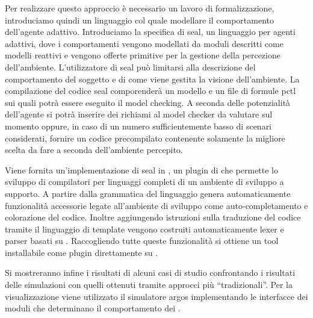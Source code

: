 Per realizzare questo approccio è necessario un lavoro di formalizzazione, introduciamo quindi un linguaggio col quale modellare il comportamento dell'agente adattivo. Introduciamo la specifica di \ac{seal}, un linguaggio per agenti adattivi, dove i comportamenti vengono modellati da moduli descritti come modelli reattivi e vengono offerte primitive per la gestione della percezione dell'ambiente. L'utilizzatore di \ac{seal} può limitarsi alla descrizione del comportamento del soggetto e di come viene gestita la visione dell'ambiente. La compilazione del codice \ac{seal} comporenderà un modello \prism{} e un file di formule \ac{pctl} sui quali potrà essere eseguito il model checking. A seconda delle potenzialità dell'agente si potrà inserire dei richiami al model checker da valutare sul momento oppure, in caso di un numero sufficientemente basso di scenari considerati, fornire un codice precompilato contenente solamente la migliore scelta da fare a seconda dell'ambiente percepito.

Viene fornita un'implementazione di \ac{seal} in \xtext{} \cite{xtext}, un plugin di \eclipse{} che permette lo sviluppo di compilatori per linguaggi completi di un ambiente di sviluppo a supporto. A partire dalla grammatica del linguaggio \xtext{} genera automaticamente funzionalità accessorie legate all'ambiente di sviluppo come auto-completamento e colorazione del codice. Inoltre aggiungendo istruzioni sulla traduzione del codice tramite il linguaggio di template \xtend{} \cite{xtend}
vengono costruiti automaticamente lexer e parser basati su \antlr{} \cite{Parr95antlr:a}.
Raccogliendo tutte queste funzionalità si ottiene un tool installabile come plugin direttamente su \eclipse{}.

Si mostreranno infine i risultati di alcuni casi di studio confrontando i risultati delle simulazioni con quelli ottenuti tramite approcci più ``tradizionali''. Per la visualizzazione viene utilizzato il simulatore 	\ac{argos} \cite{Pinciroli:IROS2011}
implementando le interfacce dei moduli \cpp{} che determinano il comportamento dei \marxbot{}.


